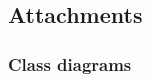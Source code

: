 \documentclass[12pt,a4paper,titlepage]{article}
\begin{document}
\restoregeometry


		\thispagestyle{empty}
		\tableofcontents
		\chapter{}
		\cleardoublepage

		\thispagestyle{empty}
		\listoffigures
		\clearpage
			
		\thispagestyle{empty}
		\listoftables
		\clearpage
		
\pagestyle{fancy}			




\clearpage

\clearpage 					%

\clearpage 					%

\clearpage

\clearpage


\clearpage
%

\section{Attachments}
\thispagestyle{plain}

\subsection{Class diagrams}
\label{sec:classDiagrams}
\end{document}
